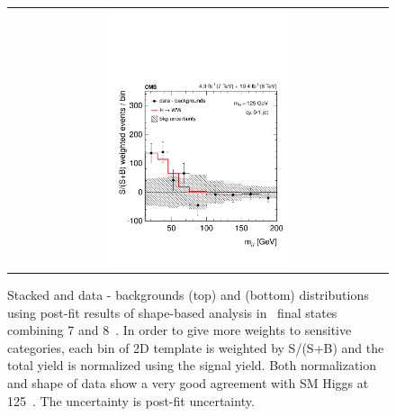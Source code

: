 \begin{figure}[htp]
\begin{tabular}{c}
\includegraphics[width=0.49\textwidth]{figures/dataminusbkg_mll_1dweight.pdf} 
\end{tabular} 
\caption{Stacked and data - backgrounds 
\mT(top) and \mll(bottom) distributions using post-fit results 
of shape-based analysis
in \DF\ final states combining 7 and 8~\TeV.
In order to give more weights to sensitive categories, each bin of 2D 
template is weighted by S/(S+B) and the total yield is normalized using the signal yield. 
Both normalization and shape of data show a very good agreement with SM Higgs at 125~\GeV.
The uncertainty is post-fit uncertainty.} 
\label{fig:post1Dprojection_1dweight} 
\end{figure} 


